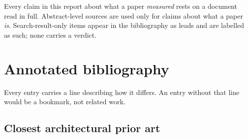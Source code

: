 \documentclass[11pt,a4paper]{article}
\begin{document}
Every claim in this report about what a paper \emph{measured} rests on a document
read in full. Abstract-level sources are used only for claims about what a paper
\emph{is}. Search-result-only items appear in the bibliography as leads and are
labelled as such; none carries a verdict.

\newpage
\section{Annotated bibliography}

Every entry carries a line describing how it differs. An entry without that line
would be a bookmark, not related work.

\subsection{Closest architectural prior art}
\end{document}
